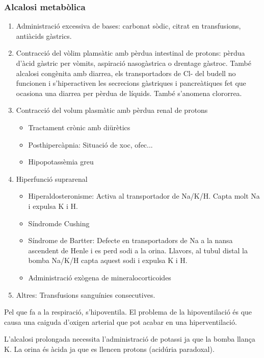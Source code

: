 \subsubsection{Alcalosi metabòlica}
\label{sec:alcalosi-metabolica}
\begin{enumerate}
\item Administració excessiva de bases: carbonat sòdic, citrat en
  transfusions, antiàcids gàstrics.

\item Contracció del vòlim plamsàtic amb pèrdua intestinal de protons:
  pèrdua d'àcid gàstric per vòmits, aspiració nasogàstrica o drentage
  gàstroc. També alcalosi congènita amb diarrea, els transportadors de
  Cl- del budell no funcionen i s'hiperactiven les secrecions
  gàstriques i pancreàtiques fet que ocasiona una diarrea per pèrdua
  de líquids. També s'anomena clororrea.

\item Contracció del volum plasmàtic amb pèrdua renal de protons
  \begin{itemize}
  \item Tractament crònic amb diürètics
  \item Posthipercàpnia: Situació de xoc, ofec...
  \item Hipopotassèmia greu 
  \end{itemize}

\item Hiperfunció suprarenal
  \begin{itemize}
  \item Hiperaldosteronisme: Activa al transportador de Na/K/H. Capta
    molt Na i expulsa K i H.
  \item Síndromde Cushing
  \item Síndrome de Bartter: Defecte en transportadors de Na a la
    nansa ascendent de Henle i es perd sodi a la orina. Llavors, al
    tubul distal la bomba Na/K/H capta aquest sodi i expulsa K i H.
  \item Administració exògena de mineralocorticoides
  \end{itemize}

\item Altres: Transfusions sanguínies consecutives.
\end{enumerate}

Pel que fa a la respiració, s'hipoventila. El problema de la
hipoventilació és que causa una caiguda d'oxigen arterial que pot
acabar en una hiperventilació.

L'alcalosi prolongada necessita l'administració de potassi ja que la
bomba llança K. La orina és àcida ja que es llencen protons (acidúria
paradoxal).

